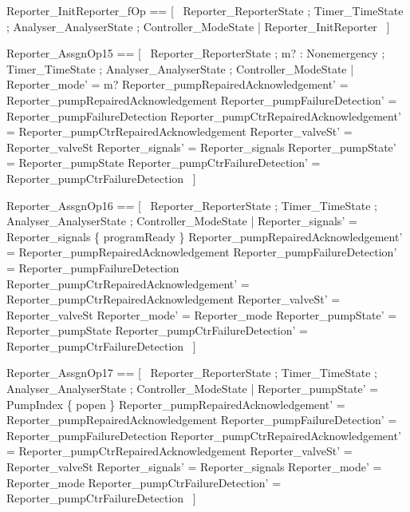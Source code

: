 \documentclass{article}
\begin{document}
\begin{zed}
	Reporter\_InitReporter\_fOp == [~  \Xi Reporter\_ReporterState ; \Xi Timer\_TimeState ; \Xi Analyser\_AnalyserState ; \Xi Controller\_ModeState | \lnot \pre Reporter\_InitReporter  ~]
\end{zed}

\begin{zed}
	Reporter\_AssgnOp15 == [~  \Delta Reporter\_ReporterState ; m? : Nonemergency ; \Xi Timer\_TimeState ; \Xi Analyser\_AnalyserState ; \Xi Controller\_ModeState | Reporter\_mode' = m? \land Reporter\_pumpRepairedAcknowledgement' = Reporter\_pumpRepairedAcknowledgement \land Reporter\_pumpFailureDetection' = Reporter\_pumpFailureDetection \land Reporter\_pumpCtrRepairedAcknowledgement' = Reporter\_pumpCtrRepairedAcknowledgement \land Reporter\_valveSt' = Reporter\_valveSt \land Reporter\_signals' = Reporter\_signals \land Reporter\_pumpState' = Reporter\_pumpState \land Reporter\_pumpCtrFailureDetection' = Reporter\_pumpCtrFailureDetection  ~]
\end{zed}

\begin{zed}
	Reporter\_AssgnOp16 == [~  \Delta Reporter\_ReporterState ; \Xi Timer\_TimeState ; \Xi Analyser\_AnalyserState ; \Xi Controller\_ModeState | Reporter\_signals' = Reporter\_signals \cup \{ programReady \} \land Reporter\_pumpRepairedAcknowledgement' = Reporter\_pumpRepairedAcknowledgement \land Reporter\_pumpFailureDetection' = Reporter\_pumpFailureDetection \land Reporter\_pumpCtrRepairedAcknowledgement' = Reporter\_pumpCtrRepairedAcknowledgement \land Reporter\_valveSt' = Reporter\_valveSt \land Reporter\_mode' = Reporter\_mode \land Reporter\_pumpState' = Reporter\_pumpState \land Reporter\_pumpCtrFailureDetection' = Reporter\_pumpCtrFailureDetection  ~]
\end{zed}

\begin{zed}
	Reporter\_AssgnOp17 == [~  \Delta Reporter\_ReporterState ; \Xi Timer\_TimeState ; \Xi Analyser\_AnalyserState ; \Xi Controller\_ModeState | Reporter\_pumpState' = PumpIndex \cross \{ popen \} \land Reporter\_pumpRepairedAcknowledgement' = Reporter\_pumpRepairedAcknowledgement \land Reporter\_pumpFailureDetection' = Reporter\_pumpFailureDetection \land Reporter\_pumpCtrRepairedAcknowledgement' = Reporter\_pumpCtrRepairedAcknowledgement \land Reporter\_valveSt' = Reporter\_valveSt \land Reporter\_signals' = Reporter\_signals \land Reporter\_mode' = Reporter\_mode \land Reporter\_pumpCtrFailureDetection' = Reporter\_pumpCtrFailureDetection  ~]
\end{zed}
\end{document}
